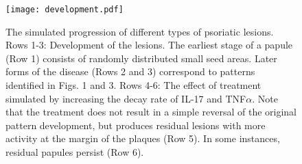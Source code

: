 \begin{figure}[p]
	\centering
	\texttt{[image: development.pdf]}
	\caption{The simulated progression of different types of psoriatic lesions. Rows 1-3: Development of the lesions. The earliest stage of a papule (Row 1) consists of randomly distributed small seed areas. Later forms of the disease (Rows 2 and 3) correspond to patterns identified in Figs. 1 and 3. Rows 4-6: The effect of treatment simulated by increasing the decay rate of IL-17 and TNF$\alpha$. Note that the treatment does not result in a simple reversal of the original pattern development, but produces residual lesions with more activity at the margin of the plaques (Row 5). In some instances, residual papules persist (Row 6).}
	\label{fig:4}
\end{figure}

\newpage

